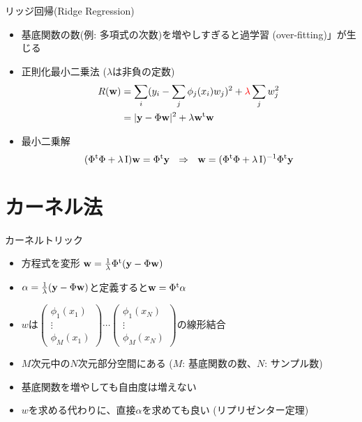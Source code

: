 \documentclass[dvipdfmx]{beamer}
\begin{document}
\begin{frame}[t,fragile]{リッジ回帰(Ridge Regression)}
  \begin{itemize}
  \item 基底関数の数(例: 多項式の次数)を増やしすぎると過学習 (over-fitting)」が生じる
  \item 正則化最小二乗法 ($\lambda$は非負の定数)
    \begin{align*}
    R({\bf w}) &= \sum_i (y_i - \sum_j \phi_j(x_i) w_j)^2 + {\color{red} \lambda} \sum_j w_j^2 \\
    &= | {\bf y} - \Phi {\bf w} |^2 + \lambda {\bf w}^{\rm t} {\bf w}
    \end{align*}
  \item 最小二乗解
    \[
    (\Phi^{\rm t} \Phi + \lambda \, {\rm I}) {\bf w} = \Phi^{\rm t} {\bf y} \ \ \Rightarrow \ \ 
      {\bf w} = (\Phi^{\rm t} \Phi + \lambda \, {\rm I})^{-1}\Phi^{\rm t} {\bf y}
      \]
  \end{itemize}
\end{frame}

\section{カーネル法}

\begin{frame}[t,fragile]{カーネルトリック}
  \begin{itemize}
  \item 方程式を変形 ${\bf w} = \frac{1}{\lambda} \Phi^{\rm t} ({\bf y} -\Phi {\bf w})$
  \item $\alpha = \frac{1}{\lambda}({\bf y} -\Phi {\bf w})$と定義すると${\bf w} =\Phi^{\rm t} \alpha$
    \item $w$は$\begin{pmatrix} \phi_1(x_1) \\ \vdots \\ \phi_M(x_1) \end{pmatrix} \cdots 
      \begin{pmatrix} \phi_1(x_N) \\ \vdots \\ \phi_M(x_N) \end{pmatrix}$の線形結合
    \item $M$次元中の$N$次元部分空間にある ($M$: 基底関数の数、$N$: サンプル数)
    \item 基底関数を増やしても自由度は増えない
    \item $w$を求める代わりに、直接$\alpha$を求めても良い (リプリゼンター定理)
  \end{itemize}
\end{frame}
\end{document}
